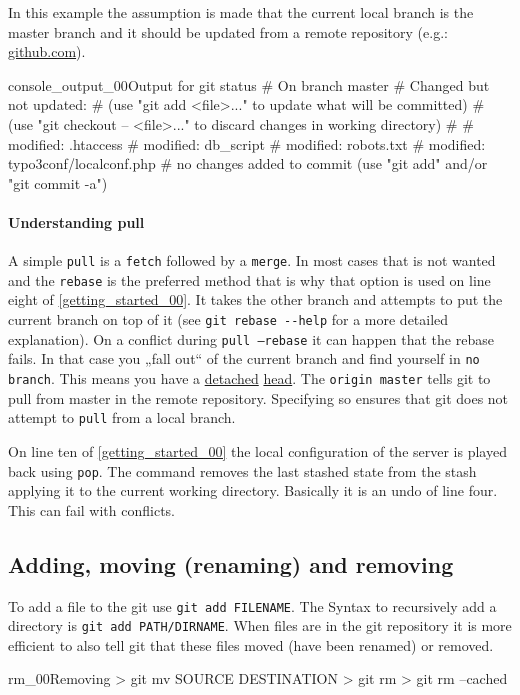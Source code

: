 In this example the assumption is made that the current local branch is the master branch and it should be updated from a remote repository (e.g.: \href{https://github.com/}{github.com}).
\begin{codelisting}{console_output_00}{Output for git status}
# On branch master
# Changed but not updated:
#   (use "git add <file>..." to update what will be committed)
#   (use "git checkout -- <file>..." to discard changes in working directory)
#
#       modified:   .htaccess
#       modified:   db_script
#       modified:   robots.txt
#       modified:   typo3conf/localconf.php
#
no changes added to commit (use "git add" and/or "git commit -a")
\end{codelisting}
\paragraph{Understanding pull}
A simple \texttt{pull} is a \texttt{fetch} followed by a \texttt{merge}. In most cases that is not wanted and the \texttt{rebase} is the preferred method that is why that option is used on line eight of \ref{getting_started_00}. It takes the other branch and attempts to put the current branch on top of it (see \texttt{git rebase -{}-help} for a more detailed explanation). On a conflict during \texttt{pull --rebase} it can happen that the rebase fails. In that case you „fall out“ of the current branch and find yourself in \texttt{no branch}. This means you have a \href{http://www.kernel.org/pub/software/scm/git/docs/git-checkout.html#_detached_head}{detached} \href{http://sitaramc.github.com/concepts/detached-head.html}{head}. The \texttt{origin master} tells git to pull from master in the remote repository. Specifying so ensures that git does not attempt to \texttt{pull} from a local branch.

On line ten of \ref{getting_started_00} the local configuration of the server is played back using \texttt{pop}. The command removes the last stashed state from the stash applying it to the current working directory. Basically it is an undo of line four. This can fail with conflicts.
\subsection{Adding, moving (renaming) and removing}
To add a file to the git use \texttt{git add FILENAME}. The Syntax to recursively add a directory is \texttt{git add PATH/DIRNAME}. When files are in the git repository it is more efficient to also tell git that these files moved (have been renamed) or removed.
\begin{codelisting}{rm_00}{Removing}
> git mv SOURCE DESTINATION
> git rm
> git rm --cached
\end{codelisting}
